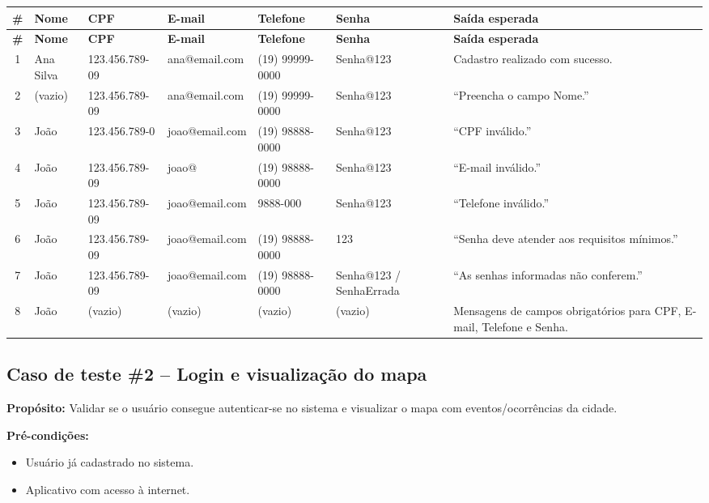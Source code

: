 \begin{longtable}{|c|p{1.5cm}|p{2cm}|p{2.5cm}|p{2cm}|p{2cm}|p{2.5cm}|}
  \hline
  \textbf{\#} & \textbf{Nome} & \textbf{CPF} & \textbf{E-mail} & \textbf{Telefone} & \textbf{Senha} & \textbf{Saída esperada} \\
  \hline
  \endfirsthead
  \hline
  \textbf{\#} & \textbf{Nome} & \textbf{CPF} & \textbf{E-mail} & \textbf{Telefone} & \textbf{Senha} & \textbf{Saída esperada} \\
  \hline
  \endhead
  1 & Ana Silva & 123.456.789-09 & ana@email.com & (19) 99999-0000 & Senha@123 & Cadastro realizado com sucesso. \\
  \hline
  2 & (vazio) & 123.456.789-09 & ana@email.com & (19) 99999-0000 & Senha@123 & ``Preencha o campo Nome.'' \\
  \hline
  3 & João & 123.456.789-0 & joao@email.com & (19) 98888-0000 & Senha@123 & ``CPF inválido.'' \\
  \hline
  4 & João & 123.456.789-09 & joao@ & (19) 98888-0000 & Senha@123 & ``E-mail inválido.'' \\
  \hline
  5 & João & 123.456.789-09 & joao@email.com & 9888-000 & Senha@123 & ``Telefone inválido.'' \\
  \hline
  6 & João & 123.456.789-09 & joao@email.com & (19) 98888-0000 & 123 & ``Senha deve atender aos requisitos mínimos.'' \\
  \hline
  7 & João & 123.456.789-09 & joao@email.com & (19) 98888-0000 & Senha@123 / SenhaErrada & ``As senhas informadas não conferem.'' \\
  \hline
  8 & João & (vazio) & (vazio) & (vazio) & (vazio) & Mensagens de campos obrigatórios para CPF, E-mail, Telefone e Senha. \\
  \hline
\end{longtable}

\subsection*{Caso de teste \#2 – Login e visualização do mapa}

\textbf{Propósito:} Validar se o usuário consegue autenticar-se no sistema e
visualizar o mapa com eventos/ocorrências da cidade.

\textbf{Pré-condições:}
\begin{itemize}
  \item Usuário já cadastrado no sistema.
  \item Aplicativo com acesso à internet.
\end{itemize}

